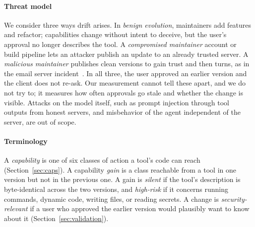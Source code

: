 \paragraph{Threat model}
We consider three ways drift arises. In \emph{benign evolution}, maintainers add features and refactor; capabilities change without intent to deceive, but the user's approval no longer describes the tool. A \emph{compromised maintainer} account or build pipeline lets an attacker publish an update to an already trusted server. A \emph{malicious maintainer} publishes clean versions to gain trust and then turns, as in the email server incident~\cite{koi2025postmark}. In all three, the user approved an earlier version and the client does not re-ask. Our measurement cannot tell these apart, and we do not try to; it measures how often approvals go stale and whether the change is visible. Attacks on the model itself, such as prompt injection through tool outputs from honest servers, and misbehavior of the agent independent of the server, are out of scope.

\paragraph{Terminology}
A \emph{capability} is one of six classes of action a tool's code can reach (Section~\ref{sec:caps}). A capability \emph{gain} is a class reachable from a tool in one version but not in the previous one. A gain is \emph{silent} if the tool's description is byte-identical across the two versions, and \emph{high-risk} if it concerns running commands, dynamic code, writing files, or reading secrets. A change is \emph{security-relevant} if a user who approved the earlier version would plausibly want to know about it (Section~\ref{sec:validation}).

